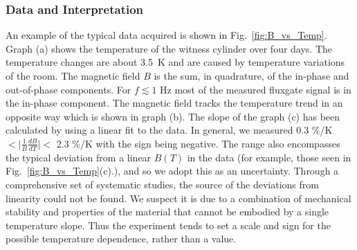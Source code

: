 




\subsubsection{Data and Interpretation}

An example of the typical data acquired is shown in
Fig.~\ref{fig:B_vs_Temp}. Graph (a) shows the temperature of the
witness cylinder over four days. The temperature changes are about
3.5~K and are caused by temperature variations of the room. The
magnetic field $B$ is the sum, in quadrature, of the in-phase and
out-of-phase components. For $f\lesssim 1$ Hz most of the measured
fluxgate signal is in the in-phase component. The magnetic field
tracks the temperature trend in an opposite way which is shown in
graph (b). The slope of the graph (c) has been calculated by using a
linear fit to the data. In general, we measured 0.3 \%/K $< \vert
\frac{1}{B} \frac{dB}{dT} \vert <$ 2.3 \%/K with the sign being
negative. The range also encompasses the typical deviation from a
linear $B(T)$ in the data (for example, those seen in
Fig.~\ref{fig:B_vs_Temp}(c).), and so we adopt this as an
uncertainty. Through a comprehensive set of systematic studies, the
source of the deviations from linearity could not be found. We suspect
it is due to a combination of mechanical stability and properties of
the material that cannot be embodied by a single temperature
slope. Thus the experiment tends to set a scale and sign for the
possible temperature dependence, rather than a value.
